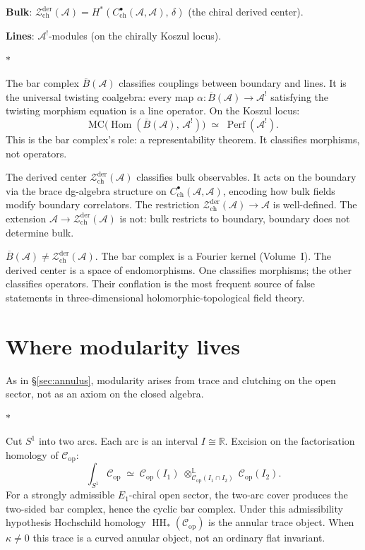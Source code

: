\documentclass[11pt]{article}
\newcommand{\cA}{\mathcal{A}}
\newcommand{\cC}{\mathcal{C}}
\newcommand{\cZ}{\mathcal{Z}}
\newcommand{\barB}{\overline{B}}
\newcommand{\R}{\mathbb{R}}
\newcommand{\MC}{\mathrm{MC}}
\newcommand{\Hom}{\operatorname{Hom}}
\newcommand{\HH}{\operatorname{HH}}
\newcommand{\Perf}{\operatorname{Perf}}
\newcommand{\Zder}{\cZ^{\mathrm{der}}_{\mathrm{ch}}}
\newcommand{\sep}{\bigskip\begin{center}$*$\end{center}\medskip}
\begin{document}
\noindent
\textbf{Bulk}: $\Zder(\cA) = H^*(C^\bullet_{\mathrm{ch}}(\cA,\cA),\,\delta)$
(the chiral derived center).

\noindent
\textbf{Lines}: $\cA^!$-modules (on the chirally Koszul locus).

\sep

The bar complex $\barB(\cA)$ classifies couplings between boundary
and lines.  It is the universal twisting coalgebra: every map
$\alpha\colon \barB(\cA) \to \cA^!$ satisfying the twisting
morphism equation is a line operator.  On the Koszul locus:
\[
\MC\bigl(\Hom(\barB(\cA),\, \cA^!)\bigr)
\;\simeq\;
\Perf(\cA^!).
\]
This is the bar complex's role: a representability theorem.  It
classifies morphisms, not operators.

The derived center $\Zder(\cA)$ classifies bulk observables.
It acts on the boundary via the brace dg-algebra structure
on $C^\bullet_{\mathrm{ch}}(\cA,\cA)$, encoding how bulk fields
modify boundary correlators.  The
restriction $\Zder(\cA) \to \cA$ is well-defined.  The extension
$\cA \to \Zder(\cA)$ is not: bulk restricts to boundary, boundary
does not determine bulk.

\begin{warning}
$\barB(\cA) \neq \Zder(\cA)$.  The bar complex is a Fourier
kernel (Volume~I).  The derived center is a space of
endomorphisms.  One classifies morphisms; the other classifies
operators.  Their conflation is the most frequent source of false
statements in three-dimensional holomorphic-topological field
theory.
\end{warning}


\section{Where modularity lives}
\label{sec:where-modularity-lives}

As in \S\ref{sec:annulus}, modularity arises from trace and
clutching on the open sector, not as an axiom on the closed algebra.

\sep

Cut $S^1$ into two arcs.  Each arc is an interval $I \cong \R$.
Excision on the factorisation homology of $\cC_{\mathrm{op}}$:
\[
\int_{S^1}\!\cC_{\mathrm{op}}
\;\simeq\;
\cC_{\mathrm{op}}(I_1)
\;\otimes_{\cC_{\mathrm{op}}(I_1 \cap I_2)}^{\mathbb{L}}\;
\cC_{\mathrm{op}}(I_2).
\]
For a strongly admissible $E_1$-chiral open sector, the two-arc
cover produces the two-sided bar complex, hence the cyclic bar
complex.  Under this admissibility hypothesis Hochschild homology
$\HH_*(\cC_{\mathrm{op}})$ is the annular trace object.  When
$\kappa\ne0$ this trace is a curved annular object, not an ordinary
flat invariant.
\end{document}
